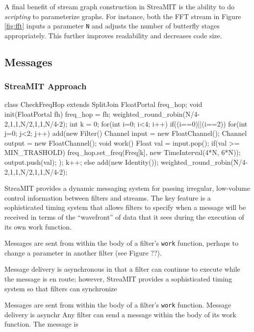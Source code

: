 A final benefit of stream graph construction in StreaMIT is the
ability to do {\it scripting} to parameterize graphs.  For instance,
both the FFT stream in Figure \ref{fig:fft} inputs a parameter {\tt N}
and adjusts the number of butterfly stages appropriately.  This
further improves readability and decreases code size.

\subsection{Messages}

\subsubsection{StreaMIT Approach}

class CheckFreqHop extends SplitJoin {
   FloatPortal freq_hop;
   void init(FloatPortal fh) {
      freq_hop = fh;
      weighted_round_robin(N/4-2,1,1,N/2,1,1,N/4-2);
      int k = 0;
      for(int i=0; i<4; i++) {
         if((i==0)||(i==2)) {
            for(int j=0; j<2; j++) {
               add(new Filter() {
                  Channel input = new FloatChannel();
                  Channel output = new FloatChannel();
                  void work() {
                     Float val = input.pop();
                     if(val >= MIN_TRASHOLD) 
                        freq_hop.set_freq(Freq[k], new TimeInterval(4*N, 6*N)); 
                     output.push(val);
                  }
               });
               k++;
            }
         } else
            add(new Identity());
      }
      weighted_round_robin(N/4-2,1,1,N/2,1,1,N/4-2);
   }
}

StreaMIT provides a dynamic messaging system for passing irregular,
low-volume control information between filters and streams.  The key
feature is a sophisticated timing system that allows filters to
specify when a message will be received in terms of the ``wavefront''
of data that it sees during the execution of its own work function.  


Messages are sent from within the body of a filter's {\tt work}
function, perhaps to change a parameter in another filter (see Figure
??).  

Message delivery is asynchronous in that a filter can continue to
execute while the message is en route; however, StreaMIT provides a
sophisticated timing system so that filters can synchronize 

Messages
are sent from within the body of a filter's {\tt work} function.
Message delivery is asynchr Any
filter can send a message within the body of its work function.  The
message is 

